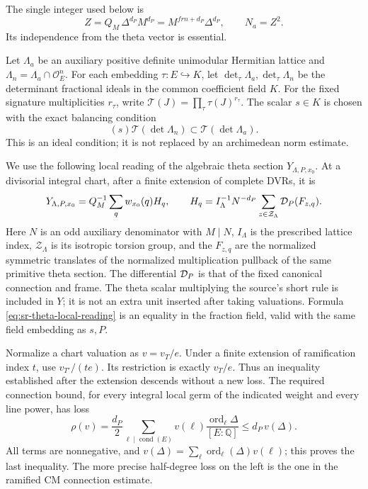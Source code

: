 The single integer used below is
\begin{equation}\label{eq:sr-common-theta-denominator}
 Z=Q_M\,\Delta^{d_P}M^{d_P}
   =M^{frn+d_P}\Delta^{d_P},\qquad N_a=Z^2.
\end{equation}
Its independence from the theta vector is essential.

Let \(\Lambda_a\) be an auxiliary positive definite unimodular
Hermitian lattice and
\(\Lambda_n=\Lambda_a\cap\mathcal O_E^n\).
For each embedding \(\tau:E\hookrightarrow K\), let
\(\det_\tau\Lambda_a,\det_\tau\Lambda_n\) be the determinant
fractional ideals in the common coefficient field \(K\).
For the fixed signature multiplicities \(r_\tau\), write
\(\mathcal T(J)=\prod_\tau\tau(J)^{r_\tau}\).
The scalar \(s\in K\) is chosen with the exact balancing condition
\begin{equation}\label{eq:sr-reflex-scalar-balance}
 (s)\mathcal T(\det\Lambda_n)
          \subset\mathcal T(\det\Lambda_a).
\end{equation}
This is an ideal condition; it is not replaced by an archimedean
norm estimate.

We use the following local reading of the algebraic theta section
\(Y_{\Lambda,P,x_0}\).
At a divisorial integral chart, after a finite extension of complete
DVRs, it is
\begin{equation}\label{eq:sr-theta-local-reading}
 Y_{\Lambda,P,x_0}
    =Q_M^{-1}\sum_{q}w_{x_0}(q)H_q,\qquad
 H_q=I_\Lambda^{-1}N^{-d_P}
       \sum_{z\in\mathcal Z_\Lambda}
                {\cal D}_P(F_{z,q}).
\end{equation}
Here \(N\) is an odd auxiliary denominator with \(M\mid N\),
\(I_\Lambda\) is the prescribed lattice index,
\(\mathcal Z_\Lambda\) is its isotropic torsion group, and the
\(F_{z,q}\) are the normalized symmetric translates of the
normalized multiplication pullback of the same primitive theta
section.  The differential \({\cal D}_P\) is that of the fixed
canonical connection and frame.
The theta scalar multiplying the source's short rule is included
in \(Y\); it is not an extra unit inserted after taking valuations.
Formula \eqref{eq:sr-theta-local-reading} is an equality in the
fraction field, valid with the same field embedding as \(s,P\).

Normalize a chart valuation as \(v=v_T/e\).
Under a finite extension of ramification index \(t\), use
\(v_{T'}/(te)\).  Its restriction is exactly \(v_T/e\).
Thus an inequality established after the extension descends
without a new loss.
The required connection bound, for every integral local germ of
the indicated weight and every line power, has loss
\begin{equation}\label{eq:sr-chart-ramification-loss}
 \rho(v)=\frac{d_P}{2}
   \sum_{\ell\mid\operatorname{cond}(E)}
       v(\ell)\frac{\operatorname{ord}_\ell\Delta}{[E:\mathbb Q]}
 \le d_P\,v(\Delta).
\end{equation}
All terms are nonnegative, and
\(v(\Delta)=\sum_\ell\operatorname{ord}_\ell(\Delta)v(\ell)\);
this proves the last inequality.
The more precise half-degree loss on the left is the one in the
ramified CM connection estimate.

